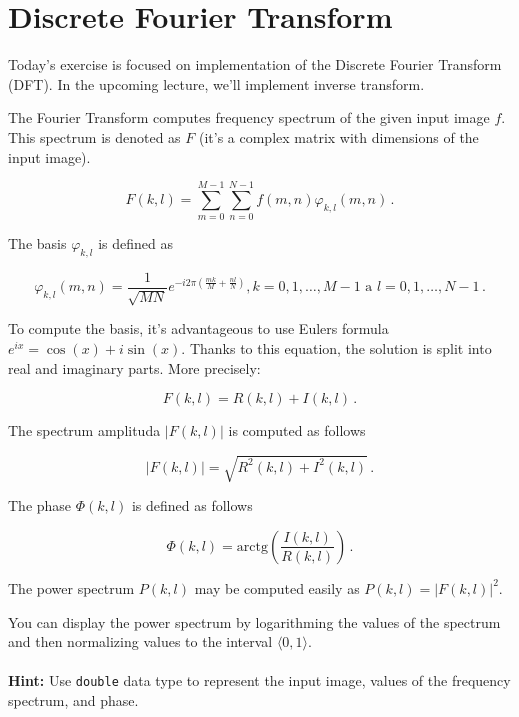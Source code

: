 \documentclass[12pt]{article}
\begin{document}
\section*{Discrete Fourier Transform}

\noindent
Today's exercise is focused on implementation of the Discrete Fourier Transform (DFT).
In the upcoming lecture, we'll implement inverse transform.

\noindent
The Fourier Transform computes frequency spectrum of the given input image $f$.
This spectrum is denoted as $F$ (it's a complex matrix with dimensions of the input image).

\begin{equation}
    F(k, l) = \sum\limits_{m=0}^{M-1} \sum\limits_{n=0}^{N-1} f(m, n) \varphi_{k, l}(m, n)\,.
\end{equation}

\noindent
The basis $\varphi_{k, l}$ is defined as

\begin{equation}
    \varphi_{k, l}(m, n) = \frac{1}{\sqrt{MN}} e^{-i 2 \pi \left( \frac{mk}{M} + \frac{nl}{N} \right) }, k = 0, 1, \dots, M-1 \,\, \mathrm{a} \,\, l = 0, 1, \dots, N-1\,.
\end{equation}

\noindent
To compute the basis, it's advantageous to use Eulers formula $e^{ix} = \cos( x ) + i \sin( x )$.
Thanks to this equation, the solution is split into real and imaginary parts. More precisely:

\begin{equation}
    F(k, l) = R(k, l) + I(k, l)\, .
\end{equation}

\noindent
The spectrum amplituda $|F(k, l)|$ is computed as follows

\begin{equation}
    |F(k, l)| = \sqrt{ R^2(k, l) + I^2(k, l)}\, .
\end{equation}

\noindent
The phase $\Phi(k, l)$ is defined as follows

\begin{equation}
    \Phi(k, l) = \mathrm{arctg}\left( \frac{I(k, l)}{R(k, l)} \right)\, .
\end{equation}

\noindent
The power spectrum $P(k, l)$ may be computed easily as $ P(k, l) = |F(k, l)|^2$.

\noindent
You can display the power spectrum by logarithming the values of the spectrum and then normalizing values to the interval $\langle 0, 1\rangle$.
%
%
\\
\\
\noindent
\textbf{Hint:} Use \texttt{double} data type to represent the input image, values of the frequency spectrum, and phase.
\end{document}
